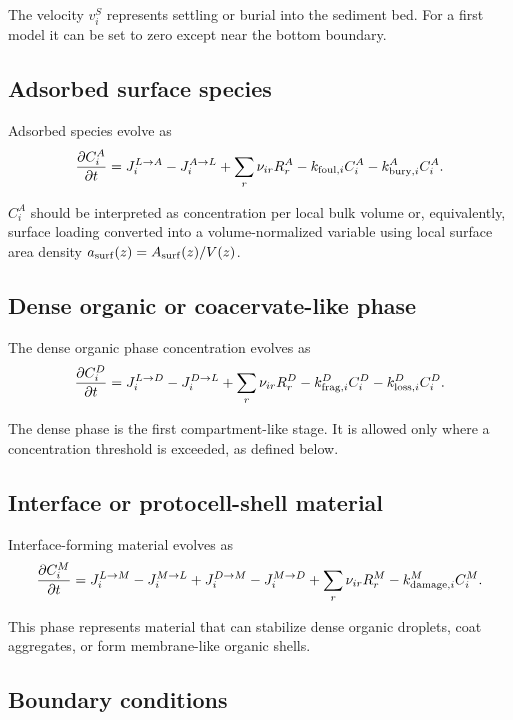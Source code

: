 \documentclass[11pt]{article}
\begin{document}
The velocity $v_i^S$ represents settling or burial into the sediment bed. For a first model it can be set to zero except near the bottom boundary.

\subsection{Adsorbed surface species}

Adsorbed species evolve as
\begin{equation}
\frac{\partial C_i^A}{\partial t}
=
J_i^{L\rightarrow A}
-J_i^{A\rightarrow L}
+\sum_r \nu_{ir}R_r^A
-k_{{\rm foul},i}C_i^A
-k_{{\rm bury},i}^A C_i^A.
\end{equation}

$C_i^A$ should be interpreted as concentration per local bulk volume or, equivalently, surface loading converted into a volume-normalized variable using local surface area density $a_{\rm surf}(z)=A_{\rm surf}(z)/V(z)$.

\subsection{Dense organic or coacervate-like phase}

The dense organic phase concentration evolves as
\begin{equation}
\frac{\partial C_i^D}{\partial t}
=
J_i^{L\rightarrow D}
-J_i^{D\rightarrow L}
+\sum_r \nu_{ir}R_r^D
-k_{{\rm frag},i}^D C_i^D
-k_{{\rm loss},i}^D C_i^D.
\end{equation}

The dense phase is the first compartment-like stage. It is allowed only where a concentration threshold is exceeded, as defined below.

\subsection{Interface or protocell-shell material}

Interface-forming material evolves as
\begin{equation}
\frac{\partial C_i^M}{\partial t}
=
J_i^{L\rightarrow M}
-J_i^{M\rightarrow L}
+J_i^{D\rightarrow M}
-J_i^{M\rightarrow D}
+\sum_r \nu_{ir}R_r^M
-k_{{\rm damage},i}^M C_i^M.
\end{equation}

This phase represents material that can stabilize dense organic droplets, coat aggregates, or form membrane-like organic shells.

\subsection{Boundary conditions}
\end{document}

